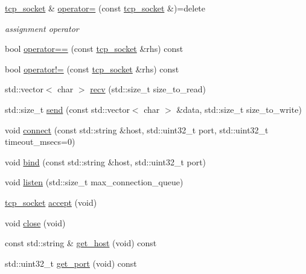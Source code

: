 \begin{DoxyCompactItemize}
\mbox{\label{classtacopie_1_1tcp__socket_aae3234c92bd36d5a614e44472d42bbf4}} 
\hyperlink{classtacopie_1_1tcp__socket}{tcp\+\_\+socket} \& \hyperlink{classtacopie_1_1tcp__socket_aae3234c92bd36d5a614e44472d42bbf4}{operator=} (const \hyperlink{classtacopie_1_1tcp__socket}{tcp\+\_\+socket} \&)=delete
\begin{DoxyCompactList}\small\item\em assignment operator \end{DoxyCompactList}\item 
bool \hyperlink{classtacopie_1_1tcp__socket_a69fde61058ab72d88ce48f557d8216cf}{operator==} (const \hyperlink{classtacopie_1_1tcp__socket}{tcp\+\_\+socket} \&rhs) const
\item 
bool \hyperlink{classtacopie_1_1tcp__socket_a76f69612969374b5aa542378d37ee398}{operator!=} (const \hyperlink{classtacopie_1_1tcp__socket}{tcp\+\_\+socket} \&rhs) const
\item 
std\+::vector$<$ char $>$ \hyperlink{classtacopie_1_1tcp__socket_a0d6d30258a902d12b3c2c62644756685}{recv} (std\+::size\+\_\+t size\+\_\+to\+\_\+read)
\item 
std\+::size\+\_\+t \hyperlink{classtacopie_1_1tcp__socket_a36521a8f502adc665ad0fb1c53583d04}{send} (const std\+::vector$<$ char $>$ \&data, std\+::size\+\_\+t size\+\_\+to\+\_\+write)
\item 
void \hyperlink{classtacopie_1_1tcp__socket_a6748c78312763dca6b8be05c4c8c3419}{connect} (const std\+::string \&host, std\+::uint32\+\_\+t port, std\+::uint32\+\_\+t timeout\+\_\+msecs=0)
\item 
void \hyperlink{classtacopie_1_1tcp__socket_a910a183d7c45483f1cdacd10a1896155}{bind} (const std\+::string \&host, std\+::uint32\+\_\+t port)
\item 
void \hyperlink{classtacopie_1_1tcp__socket_af0957ded2a84fb06d940cba98df477fb}{listen} (std\+::size\+\_\+t max\+\_\+connection\+\_\+queue)
\item 
\hyperlink{classtacopie_1_1tcp__socket}{tcp\+\_\+socket} \hyperlink{classtacopie_1_1tcp__socket_af5113c9332f83643cdaaf15c3f137760}{accept} (void)
\item 
void \hyperlink{classtacopie_1_1tcp__socket_ad5a30b17b1dad9f0ff40305e246a9213}{close} (void)
\item 
const std\+::string \& \hyperlink{classtacopie_1_1tcp__socket_ad294565f9a0fa52639ecfbf133eecd59}{get\+\_\+host} (void) const
\item 
std\+::uint32\+\_\+t \hyperlink{classtacopie_1_1tcp__socket_a5276fdc687ac3c5089a05e3e2d9de4fb}{get\+\_\+port} (void) const

\end{DoxyCompactItemize}
